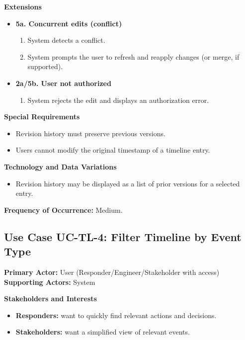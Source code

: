 \documentclass[11pt]{article}
\begin{document}
\textbf{Extensions}
\begin{itemize}[nosep]
  \item \textbf{5a. Concurrent edits (conflict)}
    \begin{enumerate}[nosep]
      \item System detects a conflict.
      \item System prompts the user to refresh and reapply changes (or merge, if supported).
    \end{enumerate}

  \item \textbf{2a/5b. User not authorized}
    \begin{enumerate}[nosep]
      \item System rejects the edit and displays an authorization error.
    \end{enumerate}
\end{itemize}

\textbf{Special Requirements}
\begin{itemize}[nosep]
  \item Revision history must preserve previous versions.
  \item Users cannot modify the original timestamp of a timeline entry.
\end{itemize}

\textbf{Technology and Data Variations}
\begin{itemize}[nosep]
  \item Revision history may be displayed as a list of prior versions for a selected entry.
\end{itemize}

\textbf{Frequency of Occurrence:} Medium.

\subsection*{Use Case UC-TL-4: Filter Timeline by Event Type}
\textbf{Primary Actor:} User (Responder/Engineer/Stakeholder with access) \\
\textbf{Supporting Actors:} System

\textbf{Stakeholders and Interests}
\begin{itemize}[nosep]
  \item \textbf{Responders:} want to quickly find relevant actions and decisions.
  \item \textbf{Stakeholders:} want a simplified view of relevant events.
\end{itemize}
\end{document}

